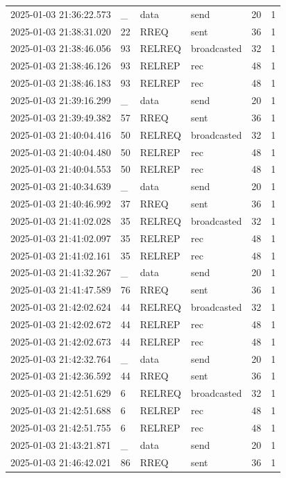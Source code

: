 \documentclass[]{nsm-thesis}
\begin{document}
\begin{longtable}{llllll}
2025-01-03 21:36:22.573 & _ & data & send & 20 & 1 \\
2025-01-03 21:38:31.020 & 22 & RREQ & sent & 36 & 1 \\
2025-01-03 21:38:46.056 & 93 & RELREQ & broadcasted & 32 & 1 \\
2025-01-03 21:38:46.126 & 93 & RELREP & rec & 48 & 1 \\
2025-01-03 21:38:46.183 & 93 & RELREP & rec & 48 & 1 \\
2025-01-03 21:39:16.299 & _ & data & send & 20 & 1 \\
2025-01-03 21:39:49.382 & 57 & RREQ & sent & 36 & 1 \\
2025-01-03 21:40:04.416 & 50 & RELREQ & broadcasted & 32 & 1 \\
2025-01-03 21:40:04.480 & 50 & RELREP & rec & 48 & 1 \\
2025-01-03 21:40:04.553 & 50 & RELREP & rec & 48 & 1 \\
2025-01-03 21:40:34.639 & _ & data & send & 20 & 1 \\
2025-01-03 21:40:46.992 & 37 & RREQ & sent & 36 & 1 \\
2025-01-03 21:41:02.028 & 35 & RELREQ & broadcasted & 32 & 1 \\
2025-01-03 21:41:02.097 & 35 & RELREP & rec & 48 & 1 \\
2025-01-03 21:41:02.161 & 35 & RELREP & rec & 48 & 1 \\
2025-01-03 21:41:32.267 & _ & data & send & 20 & 1 \\
2025-01-03 21:41:47.589 & 76 & RREQ & sent & 36 & 1 \\
2025-01-03 21:42:02.624 & 44 & RELREQ & broadcasted & 32 & 1 \\
2025-01-03 21:42:02.672 & 44 & RELREP & rec & 48 & 1 \\
2025-01-03 21:42:02.673 & 44 & RELREP & rec & 48 & 1 \\
2025-01-03 21:42:32.764 & _ & data & send & 20 & 1 \\
2025-01-03 21:42:36.592 & 44 & RREQ & sent & 36 & 1 \\
2025-01-03 21:42:51.629 & 6 & RELREQ & broadcasted & 32 & 1 \\
2025-01-03 21:42:51.688 & 6 & RELREP & rec & 48 & 1 \\
2025-01-03 21:42:51.755 & 6 & RELREP & rec & 48 & 1 \\
2025-01-03 21:43:21.871 & _ & data & send & 20 & 1 \\
2025-01-03 21:46:42.021 & 86 & RREQ & sent & 36 & 1 \\

\end{longtable}
\end{document}
